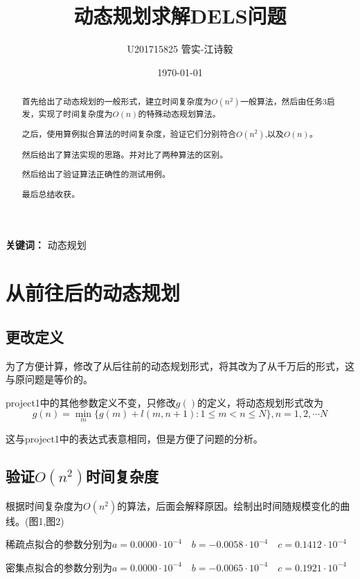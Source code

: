 \documentclass[UTF8]{ctexart}
\title{动态规划求解DELS问题}
\author{U201715825 \quad 管实-江诗毅}
\date{\today}
\begin{document}
\maketitle
\tableofcontents


\begin{abstract}
	首先给出了动态规划的一般形式，建立时间复杂度为\(O(n^2)\)一般算法，然后由任务3启发，实现了时间复杂度为\(O(n)\)的特殊动态规划算法。

	之后，使用算例拟合算法的时间复杂度，验证它们分别符合\(O(n^2)\),以及\( O(n) \)。
	
	然后给出了算法实现的思路。并对比了两种算法的区别。
	
	然后给出了验证算法正确性的测试用例。
	
	最后总结收获。
\end{abstract}
\textbf{关键词：} 动态规划

\section{从前往后的动态规划}
\subsection{更改定义}
为了方便计算，修改了从后往前的动态规划形式，将其改为了从千万后的形式，这与原问题是等价的。

project1中的其他参数定义不变，只修改\( g() \)的定义，将动态规划形式改为
\[ g(n) = \min_{m}\{ g(m) + l(m,n+1) : 1 \leq m < n \leq N \}, n = 1,2,\cdots N \]

这与project1中的表达式表意相同，但是方便了问题的分析。
\subsection{验证\( O(n^2) \)时间复杂度}
根据时间复杂度为\( O(n^2) \)的算法，后面会解释原因。绘制出时间随规模变化的曲线。(图1,图2)

稀疏点拟合的参数分别为\(a=0.0000\cdot 10^{-4}\quad b=-0.0058\cdot 10^{-4}\quad c=0.1412\cdot 10^{-4}\)

密集点拟合的参数分别为\(a=0.0000\cdot 10^{-4}\quad b=-0.0065\cdot 10^{-4}\quad c=0.1921\cdot 10^{-4}\)
\end{document}
